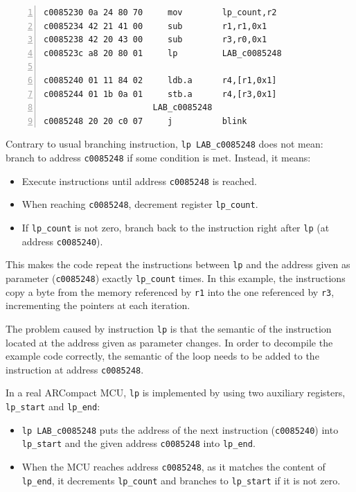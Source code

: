 \begin{lstlisting}[numbers=left, caption={Assembly code containing a loop}, label=analyzingarcompactfirmwarewithghidra:memcpyasm]
c0085230 0a 24 80 70     mov        lp_count,r2
c0085234 42 21 41 00     sub        r1,r1,0x1
c0085238 42 20 43 00     sub        r3,r0,0x1
c008523c a8 20 80 01     lp         LAB_c0085248

c0085240 01 11 84 02     ldb.a      r4,[r1,0x1]
c0085244 01 1b 0a 01     stb.a      r4,[r3,0x1]
                      LAB_c0085248
c0085248 20 20 c0 07     j          blink
\end{lstlisting}

Contrary to usual branching instruction,
\texttt{lp LAB\_c0085248} does not mean: branch to
address \texttt{c0085248} if some condition is met.
Instead, it means:

\begin{itemize}

\item
  Execute instructions until address \texttt{c0085248}
  is reached.
\item
  When reaching \texttt{c0085248}, decrement register
  \texttt{lp\_count}.
\item
  If \texttt{lp\_count} is not zero, branch back to the
  instruction right after \texttt{lp} (at address
  \texttt{c0085240}).
\end{itemize}

This makes the code repeat the instructions between
\texttt{lp} and the address given as parameter
(\texttt{c0085248}) exactly
\texttt{lp\_count} times. In this example, the
instructions copy a byte from the memory referenced by
\texttt{r1} into the one referenced by
\texttt{r3}, incrementing the pointers at each
iteration.

The problem caused by instruction \texttt{lp} is that
the semantic of the instruction located at the address given as
parameter changes. In order to decompile the example code correctly, the
semantic of the loop needs to be added to the instruction at address
\texttt{c0085248}.

In a real ARCompact MCU, \texttt{lp} is implemented by
using two auxiliary registers, \texttt{lp\_start} and
\texttt{lp\_end}:

\begin{itemize}

\item
  \texttt{lp LAB\_c0085248} puts the address of the
  next instruction (\texttt{c0085240}) into
  \texttt{lp\_start} and the given address
  \texttt{c0085248} into
  \texttt{lp\_end}.
\item
  When the MCU reaches address \texttt{c0085248}, as it
  matches the content of \texttt{lp\_end}, it
  decrements \texttt{lp\_count} and branches to
  \texttt{lp\_start} if it is not zero.
\end{itemize}


